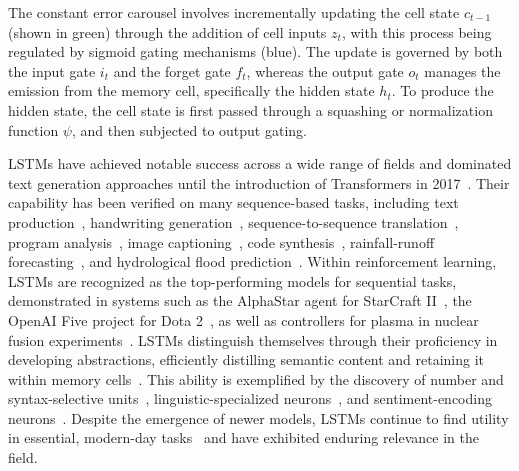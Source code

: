 The constant error carousel involves incrementally updating the cell state $c_{t-1}$ (shown in green) through the addition of cell inputs $z_t$, with this process being regulated by sigmoid gating mechanisms (blue). The update is governed by both the input gate $i_t$ and the forget gate $f_t$, whereas the output gate $o_t$ manages the emission from the memory cell, specifically the hidden state $h_t$. To produce the hidden state, the cell state is first passed through a squashing or normalization function $\psi$, and then subjected to output gating.

LSTMs have achieved notable success across a wide range of fields \citep{Hochreiter:01,Hochreiter:07,Schmidhuber:15} and dominated text generation approaches until the introduction of Transformers in 2017~\citep{Vaswani:17}. Their capability has been verified on many sequence-based tasks, including text production~\citep{Graves:13,Karpathy:15blog}, handwriting generation~\citep{Graves:13}, sequence-to-sequence translation~\citep{Sutskever:14nips}, program analysis~\citep{Zaremba:14arxiv}, image captioning~\citep{Karpathy:15,Hossain:19}, code synthesis~\citep{Karpathy:15blog}, rainfall-runoff forecasting~\citep{Kratzert:18,Kratzert:19}, and hydrological flood prediction~\citep{Nearing:24}. Within reinforcement learning, LSTMs are recognized as the top-performing models for sequential tasks, demonstrated in systems such as the AlphaStar agent for StarCraft II~\citep{Vinyals:17short}, the OpenAI Five project for Dota 2~\citep{OpenAI:19}, as well as controllers for plasma in nuclear fusion experiments~\citep{Degrave:22short}. LSTMs distinguish themselves through their proficiency in developing abstractions, efficiently distilling semantic content and retaining it within memory cells~\citep{Karpathy:15blog}. This ability is exemplified by the discovery of number and syntax-selective units~\citep{Lakretz:19}, linguistic-specialized neurons~\citep{Bau:19}, and sentiment-encoding neurons~\citep{Radford:17arxiv}. Despite the emergence of newer models, LSTMs continue to find utility in essential, modern-day tasks~\citep{Degrave:22short,Nearing:24} and have exhibited enduring relevance in the field.

